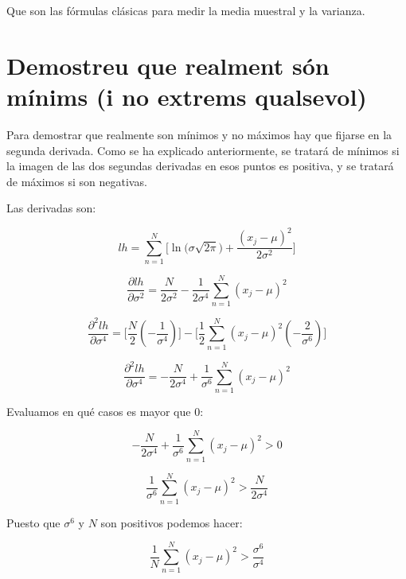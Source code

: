 \documentclass[a4paper,10pt]{article}
\begin{document}
Que son las fórmulas clásicas para medir la media muestral y la varianza.

\section{Demostreu que realment són mínims (i no extrems qualsevol)}

Para demostrar que realmente son mínimos y no máximos hay que fijarse en la segunda derivada. Como se ha explicado anteriormente, se tratará de mínimos si la imagen de las dos segundas derivadas en esos puntos es positiva, y se tratará de máximos si son negativas.

Las derivadas son:

\begin{equation*}
lh = \sum_{n = 1}^{N} \Big[ \ln{\big(  \sigma\sqrt{2\pi} \big)} + \frac{(x_j - \mu)^2}{2\sigma^2} \Big]
\end{equation*}

\begin{equation*}
\frac{\partial lh}{\partial \sigma^2} = \frac{N}{2\sigma^2} - \frac{1}{2\sigma^4}\sum_{n = 1}^{N} (x_j - \mu)^2
\end{equation*}

\begin{equation*}
\frac{\partial^2 lh}{\partial \sigma^4} = \Big[ \frac{N}{2}(-\frac{1}{\sigma^4})\Big] - \Big[\frac{1}{2}\sum_{n = 1}^{N} (x_j - \mu)^2(-\frac{2}{\sigma^6}) \Big]
\end{equation*}

\begin{equation*}
\frac{\partial^2 lh}{\partial \sigma^4} =  -\frac{N}{2\sigma^4} + \frac{1}{\sigma^6}\sum_{n = 1}^{N} (x_j - \mu)^2
\end{equation*}

Evaluamos en qué casos es mayor que $0$:

\begin{equation*}
-\frac{N}{2\sigma^4} + \frac{1}{\sigma^6}\sum_{n = 1}^{N} (x_j - \mu)^2 > 0
\end{equation*}

\begin{equation*}
\frac{1}{\sigma^6}\sum_{n = 1}^{N} (x_j - \mu)^2 > \frac{N}{2\sigma^4}
\end{equation*}

Puesto que $\sigma^6$ y $N$ son positivos podemos hacer:

\begin{equation*}
\frac{1}{N}\sum_{n = 1}^{N} (x_j - \mu)^2 > \frac{\sigma^6}{\sigma^4}
\end{equation*}
\end{document}
